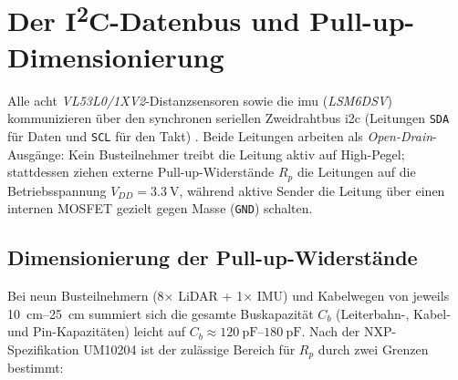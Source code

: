 \section{Der I\textsuperscript{2}C-Datenbus und Pull-up-Dimensionierung}
\label{sec:i2c_grundlagen}
Alle acht \emph{VL53L0/1XV2}-Distanzsensoren sowie die \gls{imu} (\emph{LSM6DSV}) kommunizieren über den synchronen seriellen Zweidrahtbus \gls{i2c} (Leitungen \texttt{SDA} für Daten und \texttt{SCL} für den Takt) \cite{NXP_UM10204}. Beide Leitungen arbeiten als \emph{Open-Drain}-Ausgänge: Kein Busteilnehmer treibt die Leitung aktiv auf High-Pegel; stattdessen ziehen externe Pull-up-Widerstände $R_p$ die Leitungen auf die Betriebsspannung $V_{DD} = \qty{3,3}{\volt}$, während aktive Sender die Leitung über einen internen MOSFET gezielt gegen Masse (\texttt{GND}) schalten.

\subsection{Dimensionierung der Pull-up-Widerstände}
Bei neun Busteilnehmern (8× LiDAR + 1× IMU) und Kabelwegen von jeweils \qtyrange{10}{25}{\centi\meter} summiert sich die gesamte Buskapazität $C_b$ (Leiterbahn-, Kabel- und Pin-Kapazitäten) leicht auf $C_b \approx \qtyrange{120}{180}{\pico\farad}$. Nach der NXP-Spezifikation UM10204 \cite{NXP_UM10204} ist der zulässige Bereich für $R_p$ durch zwei Grenzen bestimmt:


